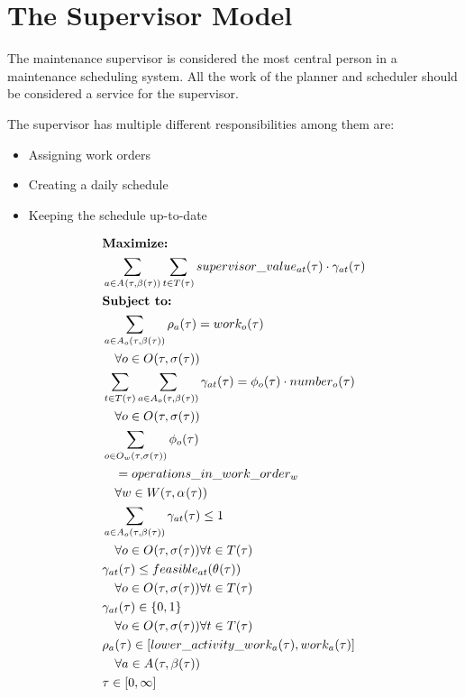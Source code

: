 \section{The Supervisor Model}
The maintenance supervisor is considered the most central person in a maintenance scheduling system. 
All the work of the planner and scheduler should be considered a service for the supervisor.

The supervisor has multiple different responsibilities among them are: 

\begin{itemize}
	\item Assigning work orders
	\item Creating a daily schedule
	\item Keeping the schedule up-to-date
\end{itemize}


\begin{alignat}{2}
	& \textbf{Maximize:} \notag\\
	& \sum_{a \in A_{}(\tau, \beta_{}(\tau))} \sum_{t \in T(\tau)} supervisor\_value_{at}(\tau) \cdot \gamma_{at}(\tau) \\ 
	& \textbf{Subject to:} \notag\\ 
	& \sum_{a \in A_{o}(\tau, \beta_{}(\tau))} \rho_{a}(\tau) = work_{o}(\tau)   \notag\\
	& \quad \forall o \in O_{}(\tau, \sigma_{}(\tau) )\\
	& \sum_{t \in T(\tau)} \sum_{a \in A_{o}(\tau, \beta_{}(\tau))}\gamma_{at}(\tau) = \phi_{o}(\tau) \cdot number_{o}(\tau) \notag\\
	& \quad \forall o \in O_{}(\tau, \sigma_{}(\tau) )  \\
	& \sum_{o \in O_{w}(\tau, \sigma_{}(\tau) )} \phi_{o}(\tau)  \notag\\ 
	& \quad = operations\_in\_work\_order_{w} \notag\\ 
	& \quad \forall w \in W(\tau, \alpha_{}(\tau))\\
	& \sum_{a \in A_{o}(\tau, \beta_{}(\tau))} \gamma_{at}(\tau) \leq 1 \notag\\
	& \quad \forall o \in O_{}(\tau, \sigma_{}(\tau) ) \forall t \in T(\tau) \\  
	& \gamma_{at}(\tau) \leq feasible_{at}(\theta_{}(\tau)) \notag\\
	& \quad \forall o \in O_{}(\tau, \sigma_{}(\tau) ) \forall t \in T(\tau) \\
	& \gamma_{at}(\tau) \in \{0, 1\} \notag\\
	& \quad \forall o \in O_{}(\tau, \sigma_{}(\tau) ) \forall t \in T(\tau) \\ 
	& \rho_{a}(\tau) \in [lower\_activity\_work_{a}(\tau), work_{a}(\tau)] \notag\\
	& \quad \forall a \in A_{}(\tau, \beta_{}(\tau)) \\
    & \tau \in  [0, \infty] 
\end{alignat}

